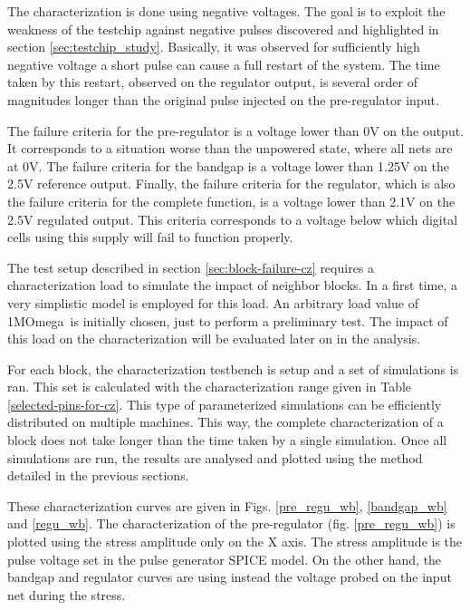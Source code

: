 The characterization is done using negative voltages.
The goal is to exploit the weakness of the testchip against negative pulses discovered and highlighted in section \ref{sec:testchip_study}.
Basically, it was observed for sufficiently high negative voltage a short pulse can cause a full restart of the system.
The time taken by this restart, observed on the regulator output, is several order of magnitudes longer than the original pulse injected on the pre-regulator input.

The failure criteria for the pre-regulator is a voltage lower than 0V on the output.
It corresponds to a situation worse than the unpowered state, where all nets are at 0V.
The failure criteria for the bandgap is a voltage lower than 1.25V on the 2.5V reference output.
Finally, the failure criteria for the regulator, which is also the failure criteria for the complete function, is a voltage lower than 2.1V on the 2.5V regulated output.
This criteria corresponds to a voltage below which digital cells using this supply will fail to function properly.

The test setup described in section \ref{sec:block-failure-cz} requires a characterization load to simulate the impact of neighbor blocks.
In a first time, a very simplistic model is employed for this load.
An arbitrary load value of 1M\textgreek{Omega}\ is initially chosen, just to perform a preliminary test.
The impact of this load on the characterization will be evaluated later on in the analysis.

For each block, the characterization testbench is setup and a set of simulations is ran.
This set is calculated with the characterization range given in Table \ref{selected-pins-for-cz}.
This type of parameterized simulations can be efficiently distributed on multiple machines.
This way, the complete characterization of a block does not take longer than the time taken by a single simulation.
Once all simulations are run, the results are analysed and plotted using the method detailed in the previous sections.

These characterization curves are given in Figs. \ref{pre_regu_wb}, \ref{bandgap_wb} and \ref{regu_wb}.
The characterization of the pre-regulator (fig. \ref{pre_regu_wb}) is plotted using the stress amplitude only on the X axis.
The stress amplitude is the pulse voltage set in the pulse generator SPICE model.
On the other hand, the bandgap and regulator curves are using instead the voltage probed on the input net during the stress.


